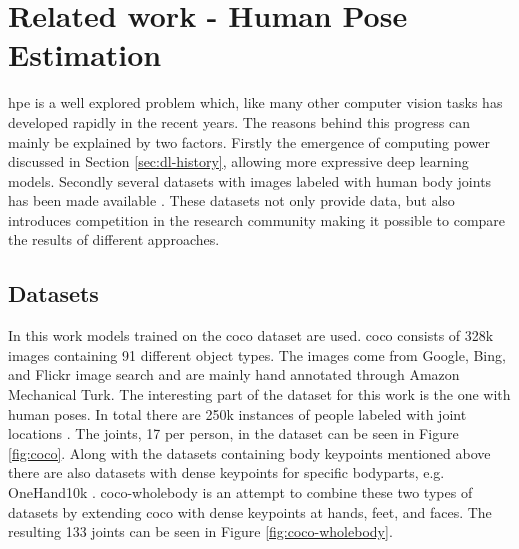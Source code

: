 \chapter{Related work - Human Pose Estimation} \label{sec:pose_estimation} \label{ch:hpe}
\gls{hpe} is a well explored problem which, like many other computer vision tasks has developed rapidly in the recent years. The reasons behind this progress can mainly be explained by two factors. Firstly the emergence of computing power discussed in Section \ref{sec:dl-history}, allowing more expressive deep learning models. Secondly several datasets with images labeled with human body joints has been made available \cite{Chen2020}. These datasets not only provide data, but also introduces competition in the research community making it possible to compare the results of different approaches.

\section{Datasets} \label{sec:datasets}

In this work models trained on the \gls{coco} dataset are used. \gls{coco} consists of 328k images containing 91 different object types. The images come from Google, Bing, and Flickr image search and are mainly hand annotated through Amazon Mechanical Turk. The interesting part of the dataset for this work is the one with human poses. In total there are 250k instances of people labeled with joint locations \cite{Lin2014}. The joints, 17 per person, in the dataset can be seen in Figure \ref{fig:coco}. Along with the datasets containing body keypoints mentioned above there are also datasets with dense keypoints for specific bodyparts, e.g. OneHand10k \cite{Wang2019}. \gls{coco}-wholebody \cite{Jin2020} is an attempt to combine these two types of datasets by extending \gls{coco} with dense keypoints at hands, feet, and faces. The resulting 133 joints can be seen in Figure \ref{fig:coco-wholebody}.

